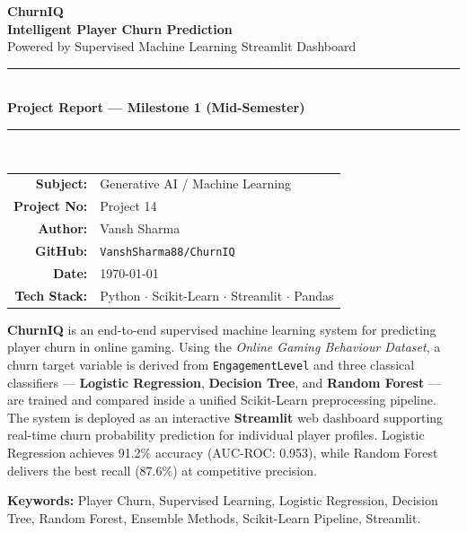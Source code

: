 \documentclass[12pt, a4paper]{article}
\begin{document}
\begin{titlepage}
    \centering
    \vspace*{1.2cm}

    {\Huge\bfseries\color{accentblue} ChurnIQ}\\[0.35cm]
    {\Large\bfseries Intelligent Player Churn Prediction}\\[0.2cm]
    {\normalsize Powered by Supervised Machine Learning \textbar{} Streamlit Dashboard}\\[0.8cm]

    \textcolor{accentblue}{\rule{\textwidth}{1.8pt}}\\[0.35cm]
    {\large\bfseries Project Report — Milestone 1 (Mid-Semester)}\\[0.35cm]
    \textcolor{accentblue}{\rule{\textwidth}{1.8pt}}\\[1.5cm]

    \begin{tabular}{@{}rl@{}}
        \textbf{Subject:}        & Generative AI / Machine Learning \\[5pt]
        \textbf{Project No:}     & Project 14 \\[5pt]
        \textbf{Author:}         & Vansh Sharma \\[5pt]
        \textbf{GitHub:}         & \texttt{VanshSharma88/ChurnIQ} \\[5pt]
        \textbf{Date:}           & \today \\[5pt]
        \textbf{Tech Stack:}     & Python $\cdot$ Scikit-Learn $\cdot$ Streamlit $\cdot$ Pandas \\
    \end{tabular}

    \vspace{1.5cm}

    \begin{infoblock}[Abstract]
    \textbf{ChurnIQ} is an end-to-end supervised machine learning system for
    predicting player churn in online gaming. Using the \textit{Online Gaming
    Behaviour Dataset}, a churn target variable is derived from
    \texttt{EngagementLevel} and three classical classifiers —
    \textbf{Logistic Regression}, \textbf{Decision Tree}, and
    \textbf{Random Forest} — are trained and compared inside a unified
    Scikit-Learn preprocessing pipeline. The system is deployed as an
    interactive \textbf{Streamlit} web dashboard supporting real-time
    churn probability prediction for individual player profiles.
    Logistic Regression achieves 91.2\% accuracy (AUC-ROC: 0.953),
    while Random Forest delivers the best recall (87.6\%) at competitive precision.
    \end{infoblock}

    \vspace{0.6cm}
    \noindent\textbf{Keywords:} Player Churn, Supervised Learning, Logistic Regression,
    Decision Tree, Random Forest, Ensemble Methods, Scikit-Learn Pipeline, Streamlit.
\end{titlepage}
\end{document}
